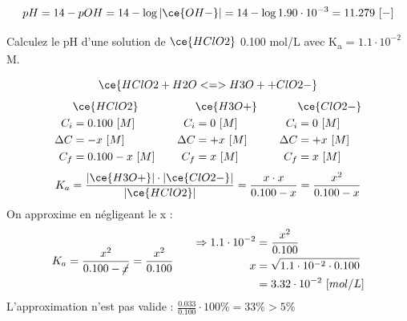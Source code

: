 \documentclass[
  11pt,
  a4paper,
  openany]{book}
\begin{document}
\[
pH = 14 - pOH = 14 - \log |\ce{OH-}| = 14 - \log 1.90 \cdot 10^{-3} = 11.279\ [-]
\]

\begin{Exercise}
Calculez le pH d'une solution de \(\ce{HClO2}\) 0.100 mol/L avec K\textsubscript{a} = \(1.1 \cdot 10^{-2}\) M.

\end{Exercise}

\begin{Answer}
\[
\ce{HClO2 + H2O <=> H3O+ + ClO2-}
\]
\[
\begin{split}
&\ce{HClO2}\\
C_i &= 0.100\ [M] \\
\Delta C &= - x\ [M] \\
C_f &= 0.100 - x\ [M] \\
\end{split}
\qquad
\begin{split}
&\ce{H3O+}\\
C_i &= 0\ [M] \\
\Delta C &= + x\ [M] \\
C_f &= x\ [M] \\
\end{split}
\qquad
\begin{split}
&\ce{ClO2-}\\
C_i &= 0\ [M] \\
\Delta C &= + x\ [M] \\
C_f &= x\ [M] \\
\end{split}
\]
\[
K_a = \frac{|\ce{H3O+}| \cdot |\ce{ClO2-}|}{|\ce{HClO2}|} = \frac{x \cdot x}{0.100-x} = \frac{x^2}{0.100-x}
\]
On approxime en négligeant le x :
\[
\begin{split}
K_a = \frac{x^2}{0.100-\cancel{x}} = \frac{x^2}{0.100}
\end{split}
\qquad
\begin{split}
\Rightarrow 1.1 \cdot 10^{-2} &= \frac{x^2}{0.100} \\
x &= \sqrt{1.1 \cdot 10^{-2} \cdot 0.100} \\
&= 3.32 \cdot 10^{-2}\ [mol/L]
\end{split}
\]
L'approximation n'est pas valide : \(\frac{0.033}{0.100} \cdot 100\% = 33\% > 5\%\)


\end{Answer}
\end{document}
